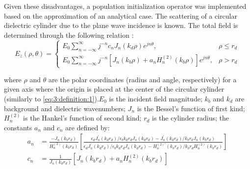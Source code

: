 			Given these disadvantages, a population initialization operator was implemented based on the approximation of an analytical case. The scattering of a circular dielectric cylinder due to the plane wave incidence is known. The total field is determined through the following relation \citep{harrington2001}:
			\begin{equation}
				E_z(\rho,\theta) = \begin{cases}
												E_0\sum\limits_{n=-\infty}^\infty j^{-n} c_n J_n(k_d\rho) e^{jn\theta},& \rho \le r_d \\
												E_0\sum\limits_{n=-\infty}^\infty j^{-n}\left[J_n(k_b\rho) + a_nH_n^{(2)}(k_b\rho)\right]e^{jn\theta},& \rho > r_d
											\end{cases} \label{eq:4:ca:totalfield}
			\end{equation}
		
			\noindent where $\rho$ and $\theta$ are the polar coordinates (radius and angle, respectively) for a given axis where the origin is placed at the center of the circular cylinder (similarly to \eqref{eq:3:definition:1}).$E_0$ is the incident field magnitude; $k_b$ and $k_d$ are background and dielectric wavenumbers; $J_n$ is the Bessel's function of first kind; $H^{(2)}_n$ is the Hankel's function of second kind; $r_d$ is the cylinder radius; the constants $a_n$ and $c_n$ are defined by:
			\begin{align}
				a_n &= \frac{-J_n(k_br_d)}{H_n^{(2)}(k_br_d)}\left[\frac{\epsilon_dJ^\prime_n(k_dr_d)/\epsilon_bk_dr_dJ_n(k_dr_d)-J^\prime_n(k_dr_d)/k_br_dJ_n(k_br_d)}{\epsilon_dJ^\prime_n(k_dr_d)/\epsilon_bk_dr_dJ_n(k_dr_d)-H^{(2)\prime}_n(k_br_d)/k_br_dH^{(2)}_n(k_br_d)}\right] \label{eq:4:ca:an} \\
				c_n &= \frac{1}{J_n(k_dr_d)}\left[J_n(k_br_d)+a_nH^{(2)}_n(k_br_d)\right] \label{eq:4:ca:cn}
			\end{align}
			

